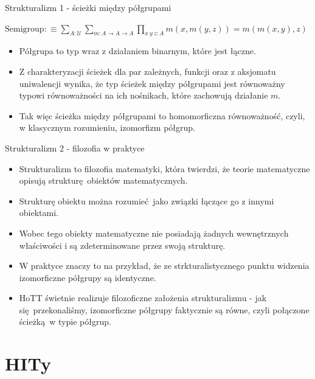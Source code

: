\documentclass{beamer}
\newcommand{\defn}{:\equiv}
\newcommand{\U}{\mathcal{U}}
\begin{document}
\begin{frame}{Strukturalizm 1 - ścieżki między półgrupami}

\begin{definition}[Półgrupa]
$\displaystyle \text{Semigroup} \defn \sum_{A : \U} \sum_{m : A \to A \to A} \prod_{x\ y\ z : A} m(x, m(y, z)) = m(m(x, y), z)$
\end{definition}

\begin{itemize}
	\item Półgrupa to typ wraz z działaniem binarnym, które jest łączne.
	\item Z charakteryzacji ścieżek dla par zależnych, funkcji oraz z aksjomatu uniwalencji wynika, że typ ścieżek między półgrupami jest równoważny typowi równoważności na ich nośnikach, które zachowują działanie $m$.
	\item Tak więc ścieżka między półgrupami to homomorficzna równoważność, czyli, w klasycznym rozumieniu, izomorfizm półgrup.
\end{itemize}

\end{frame}

\begin{frame}{Strukturalizm 2 - filozofia w praktyce}
\begin{itemize}
	\item Strukturalizm to filozofia matematyki, która twierdzi, że teorie matematyczne opisują strukturę obiektów matematycznych.
	\item Strukturę obiektu można rozumieć jako związki łączące go z innymi obiektami.
	\item Wobec tego obiekty matematyczne nie posiadają żadnych wewnętrznych właściwości i są zdeterminowane przez swoją strukturę.
	\item W praktyce znaczy to na przykład, że ze strkturalistycznego punktu widzenia izomorficzne półgrupy są identyczne.
	\item HoTT świetnie realizuje filozoficzne założenia strukturalizmu - jak się przekonaliśmy, izomorficzne półgrupy faktycznie są równe, czyli połączone ścieżką w typie półgrup. 
\end{itemize}

\end{frame}

\section{HITy}
\end{document}
